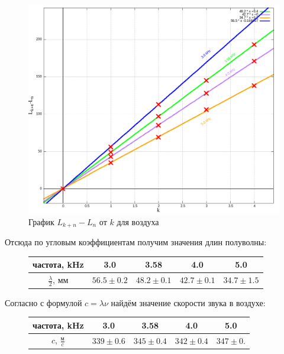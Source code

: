 \documentclass{article}
\begin{document}
\begin{figure}[H]
    \centering
    \includegraphics[width=\textwidth]{air/air.png}
    \caption{График $L_{k+n} - L_n$ от $k$ для воздуха}
\end{figure}

Отсюда по угловым коэффициентам получим значения длин полуволны:

\begin{figure}[H]
    \centering
    \begin{tabular}{|c|c|c|c|c|}
    \hline
    частота, kHz & 3.0 & 3.58 & 4.0 & 5.0 \\\hline
    $\frac{\lambda}{2}$, мм & $56.5 \pm 0.2$ & $48.2 \pm 0.1$ & $42.7 \pm 0.1$ & $34.7 \pm 1.5$ \\\hline
    \end{tabular}
\end{figure}

Согласно с формулой $c = \lambda \nu$ найдём значение скорости звука в воздухе:


\begin{figure}[H]
    \centering
    \begin{tabular}{|c|c|c|c|c|}
    \hline
    частота, kHz & 3.0 & 3.58 & 4.0 & 5.0 \\\hline
    $c$, $\frac{\text{м}}{c}$ & $339 \pm 0.6$ & $345 \pm 0.4$ & $342 \pm 0.4$ & $347 \pm 0.$\\\hline
    \end{tabular}
\end{figure}
\end{document}
